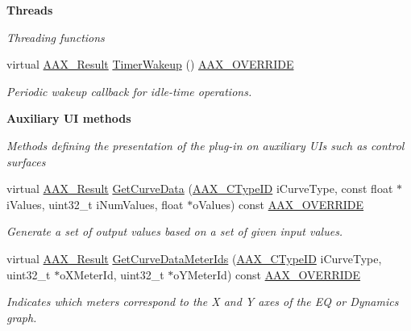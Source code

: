 \begin{Indent}{\bf Threads}\par
{\em Threading functions }\begin{DoxyCompactItemize}
\item 
virtual \hyperlink{a00149_a4d8f69a697df7f70c3a8e9b8ee130d2f}{A\+A\+X\+\_\+\+Result} \hyperlink{a00018_a075602c75297cbb136d888ffa5d97ddd}{Timer\+Wakeup} () \hyperlink{a00149_ac2f24a5172689ae684344abdcce55463}{A\+A\+X\+\_\+\+O\+V\+E\+R\+R\+I\+D\+E}
\begin{DoxyCompactList}\small\item\em Periodic wakeup callback for idle-\/time operations. \end{DoxyCompactList}\end{DoxyCompactItemize}
\end{Indent}
\begin{Indent}{\bf Auxiliary U\+I methods}\par
{\em Methods defining the presentation of the plug-\/in on auxiliary U\+Is such as control surfaces }\begin{DoxyCompactItemize}
\item 
virtual \hyperlink{a00149_a4d8f69a697df7f70c3a8e9b8ee130d2f}{A\+A\+X\+\_\+\+Result} \hyperlink{a00018_a41deeb0825a1c07f9b77c62215cb4de7}{Get\+Curve\+Data} (\hyperlink{a00149_ac678f9c1fbcc26315d209f71a147a175}{A\+A\+X\+\_\+\+C\+Type\+I\+D} i\+Curve\+Type, const float $\ast$i\+Values, uint32\+\_\+t i\+Num\+Values, float $\ast$o\+Values) const \hyperlink{a00149_ac2f24a5172689ae684344abdcce55463}{A\+A\+X\+\_\+\+O\+V\+E\+R\+R\+I\+D\+E}
\begin{DoxyCompactList}\small\item\em Generate a set of output values based on a set of given input values. \end{DoxyCompactList}\item 
virtual \hyperlink{a00149_a4d8f69a697df7f70c3a8e9b8ee130d2f}{A\+A\+X\+\_\+\+Result} \hyperlink{a00018_abd41a9d952b3ef1db63b5f00bad03bb0}{Get\+Curve\+Data\+Meter\+Ids} (\hyperlink{a00149_ac678f9c1fbcc26315d209f71a147a175}{A\+A\+X\+\_\+\+C\+Type\+I\+D} i\+Curve\+Type, uint32\+\_\+t $\ast$o\+X\+Meter\+Id, uint32\+\_\+t $\ast$o\+Y\+Meter\+Id) const \hyperlink{a00149_ac2f24a5172689ae684344abdcce55463}{A\+A\+X\+\_\+\+O\+V\+E\+R\+R\+I\+D\+E}
\begin{DoxyCompactList}\small\item\em Indicates which meters correspond to the X and Y axes of the E\+Q or Dynamics graph. \end{DoxyCompactList}\item 

\end{DoxyCompactItemize}
\end{Indent}
